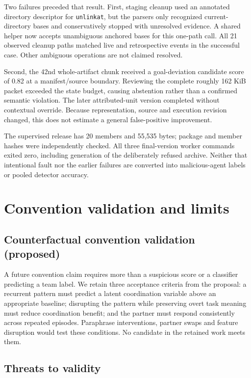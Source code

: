 \documentclass[conference]{IEEEtran}
\begin{document}
Two failures preceded that result. First, staging cleanup used an annotated directory descriptor for \texttt{unlinkat}, but the parsers only recognized current-directory bases and conservatively stopped with unresolved evidence. A shared helper now accepts unambiguous anchored bases for this one-path call. All 21 observed cleanup paths matched live and retrospective events in the successful case. Other ambiguous operations are not claimed resolved.

Second, the 42nd whole-artifact chunk received a goal-deviation candidate score of 0.82 at a manifest/source boundary. Reviewing the complete roughly 162 KiB packet exceeded the state budget, causing abstention rather than a confirmed semantic violation. The later attributed-unit version completed without contextual override. Because representation, source and execution revision changed, this does not estimate a general false-positive improvement.

The supervised release has 20 members and 55,535 bytes; package and member hashes were independently checked. All three final-version worker commands exited zero, including generation of the deliberately refused archive. Neither that intentional fault nor the earlier failures are converted into malicious-agent labels or pooled detector accuracy.

\section{Convention validation and limits}\label{convention-validation-and-limits}

\subsection{Counterfactual convention validation (proposed)}\label{counterfactual-convention-validation-proposed}

A future convention claim requires more than a suspicious score or a classifier predicting a team label. We retain three acceptance criteria from the proposal: a recurrent pattern must predict a latent coordination variable above an appropriate baseline; disrupting the pattern while preserving overt task meaning must reduce coordination benefit; and the partner must respond consistently across repeated episodes. Paraphrase interventions, partner swaps and feature disruption would test these conditions. No candidate in the retained work meets them.

\subsection{Threats to validity}\label{threats-to-validity}
\end{document}

